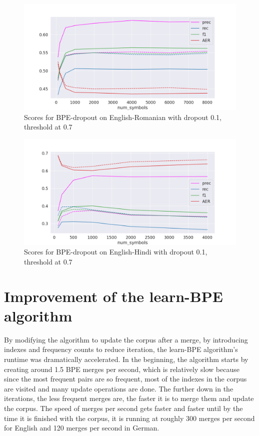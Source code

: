 \begin{figure}[!ht]
    \centering
    \includegraphics[width=12cm]{../reports/scores_dropout_bpe/space/0.1/eng_ron_0.7_thres_fastalign.png}
    \caption{Scores for BPE-dropout on English-Romanian with dropout 0.1, threshold at 0.7}
\end{figure}

\begin{figure}[!ht]
    \centering
    \includegraphics[width=12cm]{../reports/scores_dropout_bpe/space/0.1/eng_hin_0.7_thres_fastalign.png}
    \caption{Scores for BPE-dropout on English-Hindi with dropout 0.1, threshold at 0.7}
\end{figure}

\section{Improvement of the learn-BPE algorithm}

By modifying the algorithm to update the corpus after a merge, by introducing indexes and frequency counts to reduce iteration, the learn-BPE algorithm's runtime was dramatically accelerated. In the beginning, the algorithm starts by creating around 1.5 BPE merges per second, which is relatively slow because since the most frequent pairs are so frequent, most of the indexes in the corpus are visited and many update operations are done. The further down in the iterations, the less frequent merges are, the faster it is to merge them and update the corpus. The speed of merges per second gets faster and faster until by the time it is finished with the corpus, it is running at roughly 300 merges per second for English and 120 merges per second in German.

